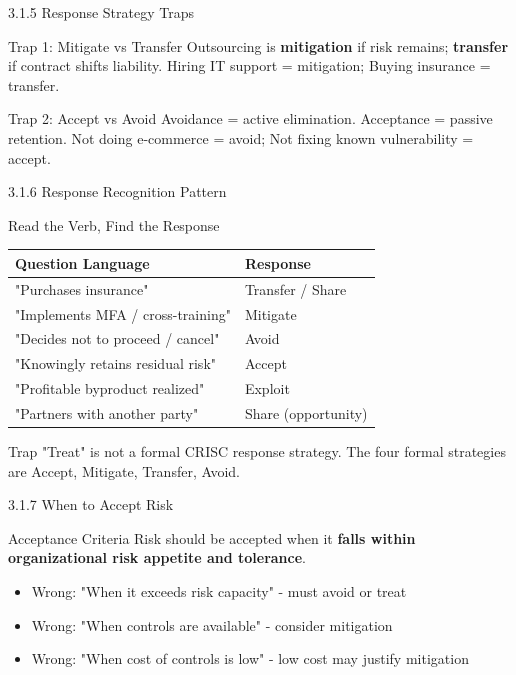 \documentclass{beamer}
\begin{document}
	\begin{frame}{3.1.5 Response Strategy Traps}
		\begin{block}{Trap 1: Mitigate vs Transfer}
			Outsourcing is \textbf{mitigation} if risk remains; \textbf{transfer} if contract shifts liability. Hiring IT support = mitigation; Buying insurance = transfer.
		\end{block}
		\begin{block}{Trap 2: Accept vs Avoid}
			Avoidance = active elimination. Acceptance = passive retention. Not doing e-commerce = avoid; Not fixing known vulnerability = accept.
		\end{block}
	\end{frame}
	
	\begin{frame}{3.1.6 Response Recognition Pattern}
		\begin{block}{Read the Verb, Find the Response}
			\begin{tabular}{|p{5cm}|p{4cm}|}
				\hline
				\textbf{Question Language} & \textbf{Response} \\
				\hline
				"Purchases insurance" & Transfer / Share \\
				\hline
				"Implements MFA / cross-training" & Mitigate \\
				\hline
				"Decides not to proceed / cancel" & Avoid \\
				\hline
				"Knowingly retains residual risk" & Accept \\
				\hline
				"Profitable byproduct realized" & Exploit \\
				\hline
				"Partners with another party" & Share (opportunity) \\
				\hline
			\end{tabular}
		\end{block}
		\begin{alertblock}{Trap}
			"Treat" is not a formal CRISC response strategy. The four formal strategies are Accept, Mitigate, Transfer, Avoid.
		\end{alertblock}
	\end{frame}
	
	\begin{frame}{3.1.7 When to Accept Risk}
		\begin{block}{Acceptance Criteria}
			Risk should be accepted when it \textbf{falls within organizational risk appetite and tolerance}.
		\end{block}
		\begin{itemize}
			\item Wrong: "When it exceeds risk capacity" - must avoid or treat
			\item Wrong: "When controls are available" - consider mitigation
			\item Wrong: "When cost of controls is low" - low cost may justify mitigation
		\end{itemize}
	\end{frame}
	
\end{document}
